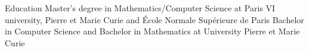 \begin{rubric}{\color{ForestGreen} Education}
  Master's degree in Mathematics/Computer Science at Paris VI university, Pierre et
  Marie Curie and École Normale Supérieure de Paris
  Bachelor in Computer Science and Bachelor in Mathematics at University Pierre et Marie Curie


\end{rubric}
